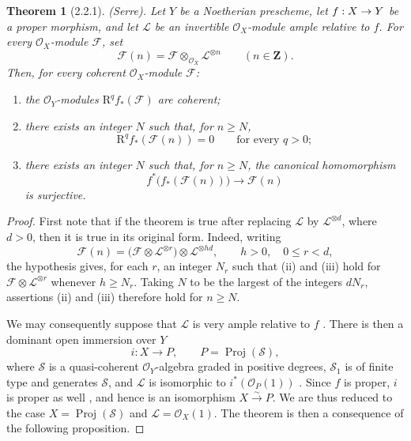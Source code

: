 \documentclass[oneside]{amsart}
\theoremstyle{ega-env-style}
\theoremstyle{ega-thm-env-style}
\newtheorem*{theorem}{Theorem}
\theoremstyle{ega-defn-env-style}
\def\mathcal{\mathscr}
\def\sh{\mathcal}                   %
\def\bb{\mathbf}                    %
\def\leq{\leqslant}                 %
\def\geq{\geqslant}                 %
\def\RR{\mathrm{R}}                 %
\def\Proj{\operatorname{Proj}}
\renewcommand{\to}{\mathchoice{\longrightarrow}{\rightarrow}{\rightarrow}{\rightarrow}}
\def\simto{\xrightarrow{\sim}}
\let\EGAOriginalLabel\label
\renewcommand{\label}[1]{\phantomsection\EGAOriginalLabel{#1}}
\begin{document}
\begin{theorem}[2.2.1]
\label{III.2.2.1}
(Serre).
Let $Y$ be a Noetherian prescheme, let $f:X\to Y$ be a proper morphism, and let $\sh{L}$ be an invertible $\sh{O}_X$-module ample relative to $f$.
For every $\sh{O}_X$-module $\sh{F}$, set
\[
  \sh{F}(n)=\sh{F}\otimes_{\sh{O}_X}\sh{L}^{\otimes n}
  \qquad(n\in\bb{Z}).
\]
Then, for every coherent $\sh{O}_X$-module $\sh{F}$:
\begin{enumerate}
  \item[{\rm(i)}] the $\sh{O}_Y$-modules $\RR^qf_*(\sh{F})$ are coherent;
  \item[{\rm(ii)}] there exists an integer $N$ such that, for $n\geq N$,
  \[
    \RR^qf_*(\sh{F}(n))=0
    \qquad\text{for every }q>0;
  \]
  \item[{\rm(iii)}] there exists an integer $N$ such that, for $n\geq N$, the canonical homomorphism
  \[
    f^*\bigl(f_*(\sh{F}(n))\bigr)\longrightarrow\sh{F}(n)
  \]
  is surjective.
\end{enumerate}
\end{theorem}

\begin{proof}
First note that if the theorem is true after replacing $\sh{L}$ by $\sh{L}^{\otimes d}$, where $d>0$, then it is true in its original form.
Indeed, writing
\[
  \sh{F}(n)
  =\bigl(\sh{F}\otimes\sh{L}^{\otimes r}\bigr)
   \otimes\sh{L}^{\otimes hd},
   \qquad h>0,\quad 0\leq r<d,
\]
the hypothesis gives, for each $r$, an integer $N_r$ such that (ii) and (iii) hold for $\sh{F}\otimes\sh{L}^{\otimes r}$ whenever $h\geq N_r$.
Taking $N$ to be the largest of the integers $dN_r$, assertions (ii) and (iii) therefore hold for $n\geq N$.

We may consequently suppose that $\sh{L}$ is very ample relative to $f$ .
There is then a dominant open immersion over $Y$
\[
  i:X\longrightarrow P,
  \qquad P=\Proj(\sh{S}),
\]
where $\sh{S}$ is a quasi-coherent $\sh{O}_Y$-algebra graded in positive degrees, $\sh{S}_1$ is of finite type and generates $\sh{S}$, and $\sh{L}$ is isomorphic to $i^*(\sh{O}_P(1))$ .
Since $f$ is proper, $i$ is proper as well , and hence is an isomorphism $X\simto P$.
We are thus reduced to the case $X=\Proj(\sh{S})$ and $\sh{L}=\sh{O}_X(1)$.
The theorem is then a consequence of the following proposition.
\end{proof}
\end{document}
